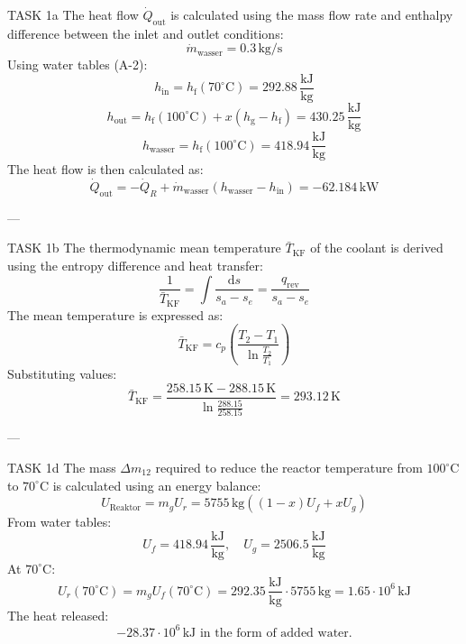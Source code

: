 TASK 1a  
The heat flow \( \dot{Q}_{\text{out}} \) is calculated using the mass flow rate and enthalpy difference between the inlet and outlet conditions:  
\[
\dot{m}_{\text{wasser}} = 0.3 \, \text{kg/s}
\]  
Using water tables (A-2):  
\[
h_{\text{in}} = h_{\text{f}}(70^\circ\text{C}) = 292.88 \, \frac{\text{kJ}}{\text{kg}}
\]  
\[
h_{\text{out}} = h_{\text{f}}(100^\circ\text{C}) + x(h_{\text{g}} - h_{\text{f}}) = 430.25 \, \frac{\text{kJ}}{\text{kg}}
\]  
\[
h_{\text{wasser}} = h_{\text{f}}(100^\circ\text{C}) = 418.94 \, \frac{\text{kJ}}{\text{kg}}
\]  
The heat flow is then calculated as:  
\[
\dot{Q}_{\text{out}} = -\dot{Q}_R + \dot{m}_{\text{wasser}}(h_{\text{wasser}} - h_{\text{in}}) = -62.184 \, \text{kW}
\]  

---

TASK 1b  
The thermodynamic mean temperature \( \bar{T}_{\text{KF}} \) of the coolant is derived using the entropy difference and heat transfer:  
\[
\frac{1}{\bar{T}_{\text{KF}}} = \int \frac{\text{d}s}{s_a - s_e} = \frac{q_{\text{rev}}}{s_a - s_e}
\]  
The mean temperature is expressed as:  
\[
\bar{T}_{\text{KF}} = c_p \left( \frac{T_2 - T_1}{\ln \frac{T_2}{T_1}} \right)
\]  
Substituting values:  
\[
\bar{T}_{\text{KF}} = \frac{258.15 \, \text{K} - 288.15 \, \text{K}}{\ln \frac{288.15}{258.15}} = 293.12 \, \text{K}
\]  

---

TASK 1d  
The mass \( \Delta m_{12} \) required to reduce the reactor temperature from \( 100^\circ\text{C} \) to \( 70^\circ\text{C} \) is calculated using an energy balance:  
\[
U_{\text{Reaktor}} = m_g U_r = 5755 \, \text{kg} \left( (1-x) U_f + x U_g \right)
\]  
From water tables:  
\[
U_f = 418.94 \, \frac{\text{kJ}}{\text{kg}}, \quad U_g = 2506.5 \, \frac{\text{kJ}}{\text{kg}}
\]  
At \( 70^\circ\text{C} \):  
\[
U_r(70^\circ\text{C}) = m_g U_f(70^\circ\text{C}) = 292.35 \, \frac{\text{kJ}}{\text{kg}} \cdot 5755 \, \text{kg} = 1.65 \cdot 10^6 \, \text{kJ}
\]  
The heat released:  
\[
-28.37 \cdot 10^6 \, \text{kJ} \text{ in the form of added water.}
\]  
